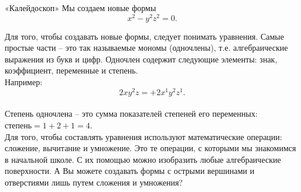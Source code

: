 \begin{surferPage}{«Калейдоскоп»}
Мы создаем новые формы \\
\smallskip
\[x^2	- y^2z^2	= 0.\]

\singlespacing
Для того, чтобы создавать новые формы, следует понимать уравнения. Самые простые  части – это так называемые мономы (одночлены), т.е. алгебраические выражения из букв и цифр.
\singlespacing
Одночлен содержит следующие элементы: знак, коэффициент, переменные и степень.\\
\singlespacing
Например:
\smallskip
\[2xy^2z = +2x^1y^2z^1.\]
\\
\smallskip
Степень одночлена – это сумма показателей степеней его переменных: $степень = 1+2+1=4$.  \\
\singlespacing
Для того, чтобы составлять уравнения используют математические операции: сложение, вычитание и умножение. Это те операции, с которыми мы знакомимся в начальной школе. С их помощью можно изобразить любые алгебраические поверхности.\singlespacing
А Вы можете создавать формы с острыми вершинами и отверстиями лишь путем сложения и умножения?
\end{surferPage}
